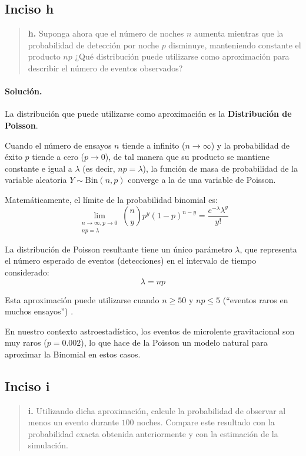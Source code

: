 \documentclass[11pt,a4paper]{article}
\begin{document}
\subsection*{Inciso h}

\begin{quote}
\textbf{h.} Suponga ahora que el número de noches $n$ aumenta mientras que la probabilidad de detección por noche $p$ disminuye, manteniendo constante el producto $np$ ¿Qué distribución puede utilizarse como aproximación para describir el número de eventos observados?
\end{quote}

\paragraph{Solución.}
La distribución que puede utilizarse como aproximación es la \textbf{Distribución de Poisson}.

Cuando el número de ensayos $n$ tiende a infinito ($n \to \infty$) y la probabilidad de éxito $p$ tiende a cero ($p \to 0$), de tal manera que su producto se mantiene constante e igual a $\lambda$ (es decir, $np = \lambda$), la función de masa de probabilidad de la variable aleatoria $Y \sim \text{Bin}(n, p)$ converge a la de una variable de Poisson.

Matemáticamente, el límite de la probabilidad binomial es:
\[
\lim_{\substack{n \to \infty, p \to 0 \\ np = \lambda}} \binom{n}{y} p^y (1-p)^{n-y} = \frac{e^{-\lambda} \lambda^y}{y!}
\]

La distribución de Poisson resultante tiene un único parámetro $\lambda$, que representa el número esperado de eventos (detecciones) en el intervalo de tiempo considerado:
\[
\lambda = np
\]

Esta aproximación puede utilizarse cuando $n \geq 50$ y $np \leq 5$ (``eventos raros en muchos ensayos'') \citep[p.~122]{devore2008}.

En nuestro contexto astroestadístico, los eventos de microlente gravitacional son muy raros ($p = 0.002$), lo que hace de la Poisson un modelo natural para aproximar la Binomial en estos casos.

\subsection*{Inciso i}

\begin{quote}
\textbf{i.} Utilizando dicha aproximación, calcule la probabilidad de observar al menos un evento durante $100$ noches. Compare este resultado con la probabilidad exacta obtenida anteriormente y con la estimación de la simulación.
\end{quote}
\end{document}
